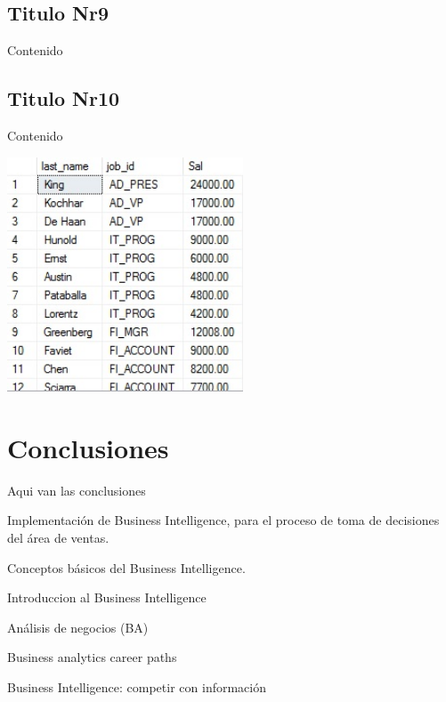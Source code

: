 \documentclass[twoside,twocolumn]{article}
\begin{document}
\subsection{Titulo Nr9}
Contenido 



\subsection{Titulo Nr10}
Contenido 

\begin{center}
	\includegraphics[width=7cm]{./Imagenes/img} 
\end{center}


\section{Conclusiones}

Aqui van las conclusiones



\begin{thebibliography}{99} 

\newblock Implementación de Business Intelligence, para el proceso de toma de decisiones del área de ventas.

Conceptos básicos del Business Intelligence.

\newblock Introduccion al Business Intelligence

\newblock Análisis de negocios (BA)

\newblock Business analytics career paths

\newblock Business Intelligence: competir con información
 

 
\end{thebibliography}

\end{document}
